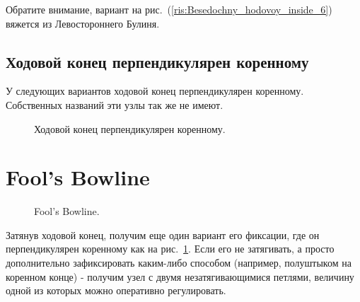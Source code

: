 \documentclass{artikel1}
\begin{document}
Обратите внимание, вариант на рис.~(\ref{ris:Besedochny_hodovoy_inside_6}) вяжется из Левостороннего Булиня.


\subsection{Ходовой конец перпендикулярен коренному}

У следующих вариантов ходовой конец перпендикулярен коренному. Собственных названий эти узлы так же не имеют.

\begin{figure}[H]\centering
\hfill
\hfill
	\caption{Ходовой конец перпендикулярен коренному.}\label{ris:Besedochny_hodovoy_inside_perp}
\end{figure}

\section{Fool's Bowline}

\begin{figure}[H]\centering
	\begin{minipage}{1\linewidth}
		\begin{center}
			\tcbox[enhanced jigsaw,colframe=black,opacityframe=0.5,opacityback=0.5]
			{\centering{}}
		\end{center}
	\end{minipage}
\caption{Fool's Bowline.}
\label{ris:Fools_Bowline}
\end{figure}

Затянув ходовой конец, получим еще один вариант его фиксации, где он перпендикулярен коренному как на рис.~\ref{ris:Besedochny_hodovoy_inside_perp}. Если его не затягивать, а просто дополнительно зафиксировать каким-либо способом (например, полуштыком на коренном конце) - получим узел с двумя незатягивающимися петлями, величину одной из которых можно оперативно регулировать.
\end{document}
